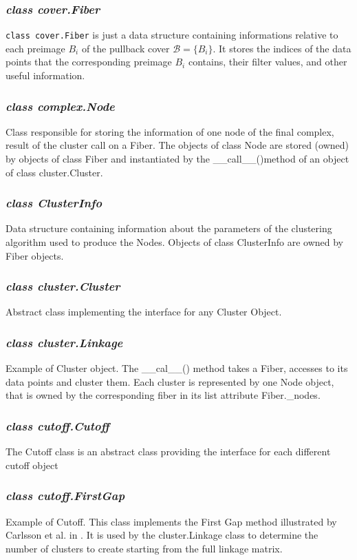 \subsubsection{\textit{class cover.Fiber}}
\lstinline|class cover.Fiber| is just a data structure containing informations relative to each preimage $B_i$ of the pullback cover $\mathcal B = \{B_i\}$. It stores the indices of the data points that the corresponding preimage $B_i$ contains, their filter values, and other useful information.
\subsubsection{\textit{class complex.Node}}
Class responsible for storing the information of one node of the final complex, result of the cluster call on a Fiber. The objects of class Node are stored (owned) by objects of class Fiber and instantiated by the \_\_call\_\_()method of an object of class cluster.Cluster.
\subsubsection{\textit{class ClusterInfo}}
Data structure containing information about the parameters of the clustering algorithm used to produce the Nodes. Objects of class ClusterInfo are owned by Fiber objects. 
\subsubsection{\textit{class cluster.Cluster}}
Abstract class implementing the interface for any Cluster Object.
\subsubsection{\textit{class cluster.Linkage}}
Example of Cluster object. The \_\_cal\_\_() method takes a Fiber, accesses to its data points and cluster them. Each cluster is represented by one Node object, that is owned by the corresponding fiber in its list attribute Fiber.\_nodes.
\subsubsection{\textit{class cutoff.Cutoff}}
The Cutoff class is an abstract class providing the interface for each different cutoff object
\subsubsection{\textit{class cutoff.FirstGap}}
Example of Cutoff. This class implements the First Gap method illustrated by Carlsson et al. in \cite{PAD}. It is used by the cluster.Linkage class to determine the number of clusters to create starting from the full linkage matrix.
